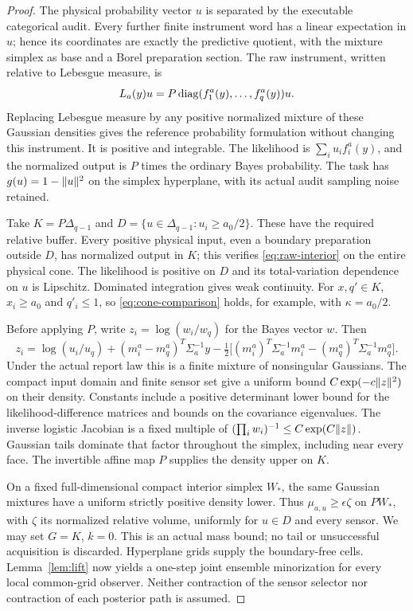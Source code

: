 \begin{proof}
The physical probability vector $u$ is separated by the executable categorical audit. Every further finite instrument word has a linear expectation in $u$; hence its coordinates are exactly the predictive quotient, with the mixture simplex as base and a Borel preparation section. The raw instrument, written relative to Lebesgue measure, is
\[
 L_a(y)u=P\operatorname{diag}(f_1^a(y),\ldots,f_q^a(y))u.
\]
Replacing Lebesgue measure by any positive normalized mixture of these Gaussian densities gives the reference probability formulation without changing this instrument. It is positive and integrable. The likelihood is $\sum_i u_i f_i^a(y)$, and the normalized output is $P$ times the ordinary Bayes probability. The task has $g(u)=1-\lVert u\rVert^2$ on the simplex hyperplane, with its actual audit sampling noise retained.

Take $K=P\Delta_{q-1}$ and $D=\{u\in\Delta_{q-1}:u_i\ge a_0/2\}$. These have the required relative buffer. Every positive physical input, even a boundary preparation outside $D$, has normalized output in $K$; this verifies \eqref{eq:raw-interior} on the entire physical cone. The likelihood is positive on $D$ and its total-variation dependence on $u$ is Lipschitz. Dominated integration gives weak continuity. For $x,q'\in K$, $x_i\ge a_0$ and $q'_i\le1$, so \eqref{eq:cone-comparison} holds, for example, with $\kappa=a_0/2$.

Before applying $P$, write $z_i=\log(w_i/w_q)$ for the Bayes vector $w$. Then
\[
 z_i=\log(u_i/u_q)+(m_i^a-m_q^a)^T\Sigma_a^{-1}y
 -\tfrac12\bigl[(m_i^a)^T\Sigma_a^{-1}m_i^a-(m_q^a)^T\Sigma_a^{-1}m_q^a\bigr].
\]
Under the actual report law this is a finite mixture of nonsingular Gaussians. The compact input domain and finite sensor set give a uniform bound
$C\exp(-c\lVert z\rVert^2)$ on their density. Constants include a positive determinant lower bound for the likelihood-difference matrices and bounds on the covariance eigenvalues. The inverse logistic Jacobian is a fixed multiple of $(\prod_iw_i)^{-1}\le C\exp(C\lVert z\rVert)$. Gaussian tails dominate that factor throughout the simplex, including near every face. The invertible affine map $P$ supplies the density upper on $K$.

On a fixed full-dimensional compact interior simplex $W_*$, the same Gaussian mixtures have a uniform strictly positive density lower. Thus $\mu_{a,u}\ge\epsilon\zeta$ on $PW_*$, with $\zeta$ its normalized relative volume, uniformly for $u\in D$ and every sensor. We may set $G=K$, $k=0$. This is an actual mass bound; no tail or unsuccessful acquisition is discarded. Hyperplane grids supply the boundary-free cells. Lemma~\ref{lem:lift} now yields a one-step joint ensemble minorization for every local common-grid observer. Neither contraction of the sensor selector nor contraction of each posterior path is assumed.
\end{proof}


